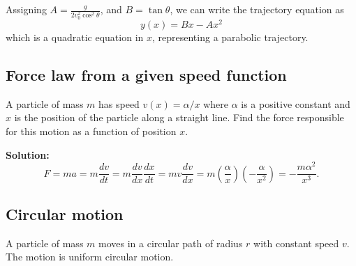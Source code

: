 \documentclass[12pt]{article}
\begin{document}
Assigning $A = \frac{g}{2 v_0^2 \cos^2 \theta}$, and $B = \tan \theta$, we can write the trajectory equation as
\begin{equation}
    \boxed{y(x) = Bx - Ax^2}
\end{equation}
which is a quadratic equation in $x$, representing a parabolic trajectory.

\subsection{Force law from a given speed function}
A particle of mass $m$ has speed $v(x) = \alpha / x$ where $\alpha$ is a positive constant and $x$ is the position of the particle along a straight line. Find the force responsible for this motion as a function of position $x$.

\textbf{Solution:} 
\begin{equation}
    F = m a = m \frac{dv}{dt} = m \frac{dv}{dx} \frac{dx}{dt} = m v \frac{dv}{dx} = m \left(\frac{\alpha}{x}\right) \left(-\frac{\alpha}{x^2}\right) = -\frac{m \alpha^2}{x^3}.
\end{equation}



\subsection{Circular motion}
A particle of mass $m$ moves in a circular path of radius $r$ with constant speed $v$. The motion is uniform circular motion.
\end{document}
